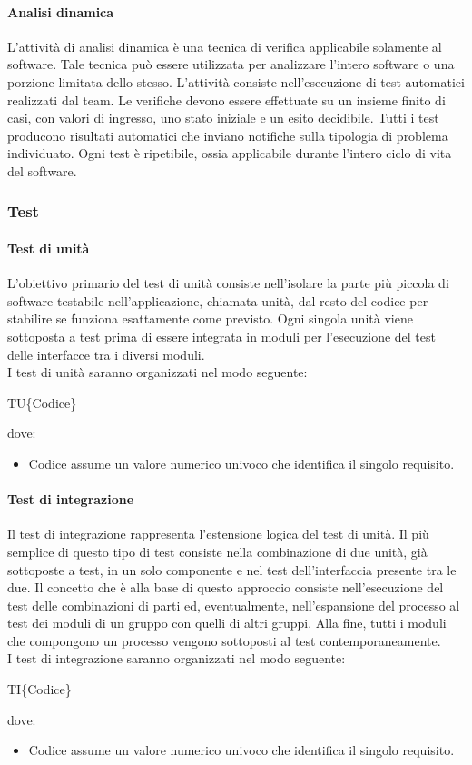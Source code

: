\paragraph{Analisi dinamica}
L'attività di analisi dinamica è una tecnica di verifica applicabile solamente al software. Tale tecnica può essere utilizzata per analizzare l'intero software o una
porzione limitata dello stesso. L'attività consiste nell'esecuzione di test automatici realizzati
dal team. Le verifiche devono essere effettuate su un insieme finito di casi, con valori di
ingresso, uno stato iniziale e un esito decidibile. Tutti i test producono risultati automatici
che inviano notifiche sulla tipologia di problema individuato. Ogni test è ripetibile, ossia applicabile durante l'intero ciclo di vita del software.

\subsubsection{Test}
\paragraph{Test di unità}
L'obiettivo primario del test di unità consiste nell'isolare la parte più piccola di software testabile
nell'applicazione, chiamata unità, dal resto del codice per stabilire se funziona esattamente come previsto. Ogni singola unità viene sottoposta a test prima di essere integrata in moduli per
l'esecuzione del test delle interfacce tra i diversi moduli.\\
I test di unità saranno organizzati nel modo seguente: \\
\begin{center}TU\{Codice\}\end{center}
dove:
\begin{itemize}
	\item Codice assume un valore numerico univoco che identifica il singolo requisito.
\end{itemize}
\paragraph{Test di integrazione}
Il test di integrazione rappresenta l'estensione logica del test di unità. Il più semplice di questo
tipo di test consiste nella combinazione di due unità, già sottoposte a test, in un solo componente
e nel test dell'interfaccia presente tra le due. Il concetto che è alla base di questo approccio
consiste nell'esecuzione del test delle combinazioni di parti ed, eventualmente, nell'espansione
del processo al test dei moduli di un gruppo con quelli di altri gruppi. Alla fine, tutti i moduli
che compongono un processo vengono sottoposti al test contemporaneamente.\\
I test di integrazione saranno organizzati nel modo seguente: \\
\begin{center}TI\{Codice\}\end{center}
dove:
\begin{itemize}
	\item Codice assume un valore numerico univoco che identifica il singolo requisito.
\end{itemize}
